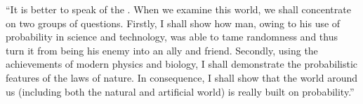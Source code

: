 \begin{dialogue}
\athr  ``It is better to speak of the . When we examine this world, we shall
  concentrate on two groups of questions. Firstly, I shall show how
  man, owing to his use of probability in science and technology, was
  able to  tame randomness and thus turn it from being his enemy
  into an ally and friend. Secondly, using the achievements of modern
  physics and biology, I shall demonstrate the probabilistic features
  of the laws of nature. In consequence, I shall show that the world
  around us (including both the natural and artificial world) is
  really built on probability.''
  
\end{dialogue}
\cleardoublepage


